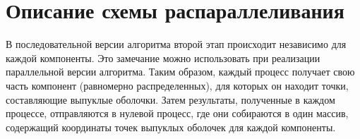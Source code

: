 \section{Описание схемы распараллеливания}
В последовательной версии алгоритма второй этап происходит независимо для каждой компоненты. Это замечание можно использовать при реализации параллельной версии алгоритма.\n
Таким образом, каждый процесс получает свою часть компонент (равномерно распределенных), для которых он находит точки, составляющие выпуклые оболочки. Затем результаты, полученные в каждом процессе, отправляются в нулевой процесс, где они собираются в один массив, содержащий координаты точек выпуклых оболочек для каждой компоненты.